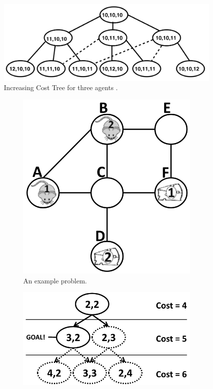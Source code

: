 \documentclass[english]{article}
\begin{document}
	\begin{figure}[t]
		\centering
		\includegraphics[width=0.5\linewidth]{img/ict}
		\caption{Increasing Cost Tree for three agents \cite{sharon2013}.}
		\label{fig:ict}
		\vspace{-30pt}
	\end{figure}
	\begin{figure}
		
	\end{figure}
	
	
	\begin{figure}[b]
		\centering
		\begin{subfigure}{0.2\textwidth}
			\centering
			\includegraphics[width=\linewidth]{img/mdds1}
			\caption{An example problem.}
			\label{fig:problem}
		\end{subfigure}
		\hfill
		\begin{subfigure}{0.3\textwidth}
			\centering
			\includegraphics[width=\linewidth]{img/ict2}

\end{subfigure}
\end{figure}
\end{document}
